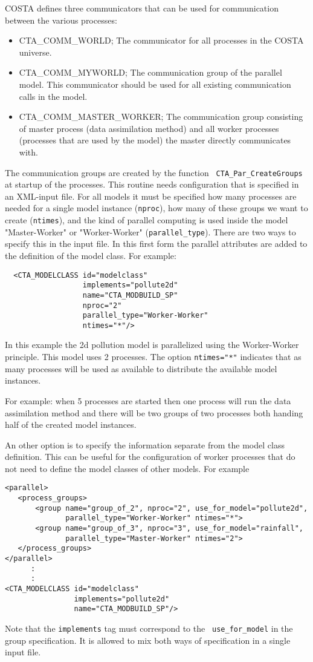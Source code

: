 COSTA defines three communicators that can be used for communication
between the various processes:
\begin{itemize}
\item CTA\_COMM\_WORLD; The communicator for all processes in the
      COSTA universe.
\item CTA\_COMM\_MYWORLD; The communication group of the parallel model.
      This communicator should be used for all existing communication calls in
      the model.
\item CTA\_COMM\_MASTER\_WORKER; The communication group consisting of
      master process (data assimilation method) and all worker processes
      (processes that are used by the model) the master directly
      communicates with.
\end{itemize}

The communication groups are created by the function {\tt
CTA\_Par\_CreateGroups} at startup of the processes. This routine needs
configuration that is specified in an XML-input file. For all models it
must be specified how many processes are needed for a single model instance
({\tt nproc}), how many of these groups we want to create ({\tt ntimes}), and
the kind of parallel computing is used inside the model "Master-Worker" or
"Worker-Worker" ({\tt parallel\_type}). There are two ways to specify this in
the input file. In this first form the parallel attributes are added to the
definition of the model class. For example:
\begin{verbatim}
  <CTA_MODELCLASS id="modelclass"
                  implements="pollute2d"
                  name="CTA_MODBUILD_SP"
                  nproc="2" 
                  parallel_type="Worker-Worker"
                  ntimes="*"/>
\end{verbatim}
In this example the 2d pollution model is parallelized using the
Worker-Worker principle. This model uses 2 processes. The
option {\tt ntimes="*"} indicates that as many processes will be used as
available to distribute the available model instances.

For example: when 5 processes are started then one process will run the
data assimilation method and there will be two groups of two processes both
handing half of the created model instances.

An other option is to specify the information separate from the model class
definition. This can be useful for the configuration of worker processes
that do not need to define the model classes of other models. For example
\begin{verbatim}
<parallel>
   <process_groups>
       <group name="group_of_2", nproc="2", use_for_model="pollute2d",
              parallel_type="Worker-Worker" ntimes="*">
       <group name="group_of_3", nproc="3", use_for_model="rainfall",
              parallel_type="Master-Worker" ntimes="2">
   </process_groups>
</parallel>
      :
      :
<CTA_MODELCLASS id="modelclass"
                implements="pollute2d"
                name="CTA_MODBUILD_SP"/>

\end{verbatim}
Note that the {\tt implements} tag must correspond to the {\tt
use\_for\_model} in the group specification. It is allowed to mix both ways
of specification in a single input file. 

